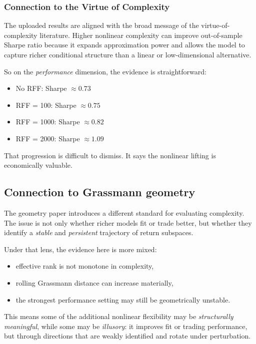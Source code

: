 \documentclass[twoside,11pt,letter]{article}
\begin{document}
\subsubsection{Connection to the Virtue of Complexity}

The uploaded results are aligned with the broad message of the virtue-of-complexity literature. Higher nonlinear complexity can improve out-of-sample Sharpe ratio because it expands approximation power and allows the model to capture richer conditional structure than a linear or low-dimensional alternative.

So on the \emph{performance} dimension, the evidence is straightforward:
\begin{itemize}
\item No RFF: Sharpe $\approx 0.73$
\item RFF = 100: Sharpe $\approx 0.75$
\item RFF = 1000: Sharpe $\approx 0.82$
\item RFF = 2000: Sharpe $\approx 1.09$
\end{itemize}

That progression is difficult to dismiss. It says the nonlinear lifting is economically valuable.
	
\subsection{Connection to Grassmann geometry}

The geometry paper introduces a different standard for evaluating complexity.
The issue is not only whether richer models fit or trade better, but whether they identify a \emph{stable} and \emph{persistent}
trajectory of return subspaces.

Under that lens, the evidence here is more mixed:
\begin{itemize}
\item effective rank is not monotone in complexity,
\item rolling Grassmann distance can increase materially,
\item the strongest performance setting may still be geometrically unstable.
\end{itemize}

This means some of the additional nonlinear flexibility may be \emph{structurally meaningful}, while some may be \emph{illusory}:
it improves fit or trading performance, but through directions that are weakly identified and rotate under perturbation.
\end{document}
